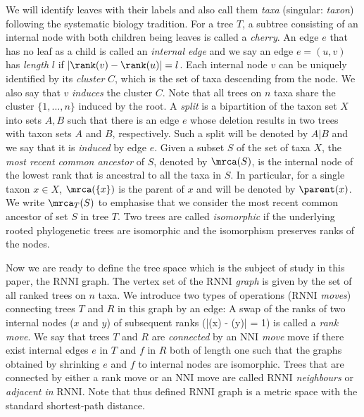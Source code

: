 \documentclass{amsart}
\newcommand{\nni}{\mathrm{NNI}}
\newcommand{\rnni}{\mathrm{RNNI}}
\begin{document}
We will identify leaves with their labels and also call them \emph{taxa} (singular: \emph{taxon}) following the systematic biology tradition.
For a tree $T$, a subtree consisting of an internal node with both children being leaves is called a \emph{cherry}.
An edge $e$ that has no leaf as a child is called an \emph{internal edge} and we say an edge $e=(u,v)$ has \emph{length} $l$ if $|\rank(v) - \rank(u)| = l$.
Each internal node $v$ can be uniquely identified by its \emph{cluster} $C$, which is the set of taxa descending from the node.
We also say that $v$ \emph{induces} the cluster $C$.
Note that all trees on $n$ taxa share the cluster $\{1,\ldots,n\}$ induced by the root.
A \emph{split} is a bipartition of the taxon set $X$ into sets $A,B$ such that there is an edge $e$ whose deletion results in two trees with taxon sets $A$ and $B$, respectively.
Such a split will be denoted by $A|B$ and we say that it is \emph{induced} by edge $e$.
Given a subset $S$ of the set of taxa $X$, the \emph{most recent common ancestor} of $S$, denoted by $\mrca(S)$, is the internal node of the lowest rank that is ancestral to all the taxa in $S$.
In particular, for a single taxon $x \in X$, $\mrca(\{x\})$ is the parent of $x$ and will be denoted by $\parent(x)$.
We write $\mrca_T(S)$ to emphasise that we consider the most recent common ancestor of set $S$ in tree $T$.
Two trees are called \emph{isomorphic} if the underlying rooted phylogenetic trees are isomorphic and the isomorphism preserves ranks of the nodes.

Now we are ready to define the tree space which is the subject of study in this paper, the $\rnni$ graph.
The vertex set of the \emph{$\rnni$ graph} is given by the set of all ranked trees on $n$ taxa.
We introduce two types of operations (\emph{$\rnni$ moves}) connecting trees $T$ and $R$ in this graph by an edge:
A swap of the ranks of two internal nodes ($x$ and $y$) of subsequent ranks (|\rank(x) - \rank(y)| = 1) is called a \emph{rank move}.
We say that trees $T$ and $R$ are \emph{connected} by an \emph{$\nni$ move} move if there exist internal edges $e$ in $T$ and $f$ in $R$ both of length one such that the graphs obtained by shrinking $e$ and $f$ to internal nodes are isomorphic.
Trees that are connected by either a rank move or an $\nni$ move are called \emph{$\rnni$ neighbours} or \emph{adjacent in} $\rnni$.
Note that thus defined $\rnni$ graph is a metric space with the standard shortest-path distance.
\end{document}
